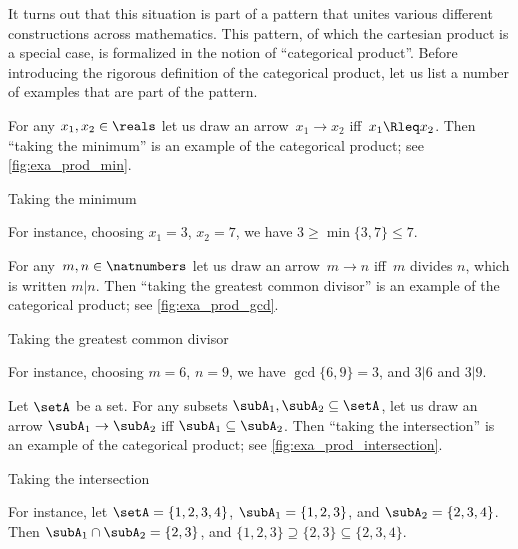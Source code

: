 It turns out that this situation is part of a pattern that unites various different constructions across mathematics. This pattern, of which the cartesian product is a special case, is formalized in the notion of ``categorical product''. Before introducing the rigorous definition of the categorical product, let us list a number of examples that are part of the pattern. 


\begin{example}\label{exa:min-as-prod}
For any $x_1,x_2\in \reals$ let us draw an arrow~$x_1\to x_2$ iff~$x_1\Rleq x_2$. Then ``taking the minimum''  is an example of the categorical product; see \cref{fig:exa_prod_min}. 
  \begin{marginfigure}
  \begin{center}
  \end{center}
    \caption{Taking the minimum}
    \label{fig:exa_prod_min}
  \end{marginfigure}
For instance, choosing $x_1 = 3$, $x_2 = 7$, we have $3 \geq \min \{3, 7\} \leq 7$. 
\end{example}

\begin{example}\label{exa:gcd-as-prod}
For any~$m, n \in \natnumbers$ let us draw an arrow~$m \to n$ iff~$m$ divides $n$, which is written $m | n$. Then ``taking the greatest common divisor'' is an example of the categorical product; see \cref{fig:exa_prod_gcd}. 
  \begin{marginfigure}
  \begin{center}
  \end{center}
    \caption{Taking the greatest common divisor}
    \label{fig:exa_prod_gcd}
  \end{marginfigure}
 For instance, choosing $m = 6$, $n = 9$, we have $\gcd \{6, 9 \} = 3$, and $3 | 6$ and $3 | 9$. 
\end{example}

\begin{example}\label{exa:intersection-as-prod}
Let $\setA$ be a set. For any subsets $\subA_1, \subA_2 \subseteq \setA$, let us draw an arrow $\subA_1 \to \subA_2$ iff $\subA_1 \subseteq \subA_2$.  Then ``taking the intersection'' is an example of the categorical product; see \cref{fig:exa_prod_intersection}. 
  \begin{marginfigure}
  \begin{center}
  \end{center}
    \caption{Taking the intersection}
    \label{fig:exa_prod_intersection}
  \end{marginfigure}
 For instance, let $\setA = \{ 1, 2, 3, 4 \}$, $\subA_1 = \{ 1, 2, 3 \}$, and $\subA_2 = \{2, 3, 4 \}$. Then $\subA_1 \cap \subA_2 = \{2, 3 \}$, and $\{ 1, 2, 3 \} \supseteq \{2, 3 \} \subseteq \{2, 3, 4 \}$. 
\end{example}



